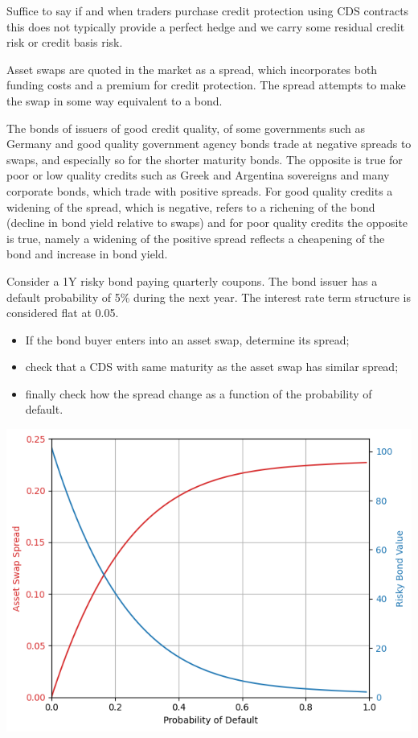 \documentclass[12pt,a4paper]{article}
\begin{document}
Suffice to say if and when traders purchase credit protection using CDS contracts this does not typically provide a perfect hedge and we carry some residual credit risk or credit basis risk.

Asset swaps are quoted in the market as a spread, which incorporates both funding costs and a premium for credit protection. The spread attempts to make the swap in some way equivalent to a bond.

The bonds of issuers of good credit quality, of some governments such as Germany and good quality government agency bonds trade at negative spreads to swaps, and especially so for the shorter maturity bonds. The opposite is true for poor or low quality credits such as Greek and Argentina sovereigns and many corporate bonds, which trade with positive spreads. For good quality credits a widening of the spread, which is negative, refers to a richening of the bond (decline in bond yield relative to swaps) and for poor quality credits the opposite is true, namely a widening of the positive spread reflects a cheapening of the bond and increase in bond yield.

\begin{question}
Consider a 1Y risky bond paying quarterly coupons. The bond issuer has a default probability of 5\% during the next year. The interest rate term structure is considered flat at 0.05.

\begin{itemize}
\item If the bond buyer enters into an asset swap, determine its spread;
\item check that a CDS with same maturity as the asset swap has similar spread;
\item finally check how the spread change as a function of the probability of default.
\end{itemize}
\begin{center}
	\includegraphics[width=0.6\linewidth]{addons/asset_swap_spread}
\end{center}
\end{question}
\end{document}
